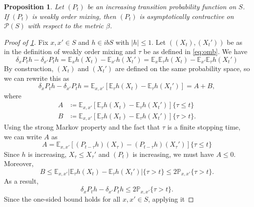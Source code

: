 \documentclass[10pt,a4paper]{amsart}
\newtheorem{proposition}{Proposition}
\newcommand{\EE}{\mathbb E}
\newcommand{\PP}{\mathbb P}
\newcommand{\pP}{\mathscr{P}}
\begin{document}
\begin{proposition}\label{p:orwomnew}
    Let $(P_t)$ be an increasing transition probability function on $S$.
    If $(P_t)$ is weakly order mixing, then $(P_t)$ is
    asymptotically contractive on $\pP(S)$ with respect to the metric $\beta$.
\end{proposition}

\begin{proof}[Proof of \cref{p:orwomnew}]
    Fix $x, x' \in S$ and $h \in ibS$ with $|h| \leq 1$.  Let $((X_t),
    (X_t'))$ be as in the definition of weakly order mixing and $\tau$ be as
    defined in \eqref{eq:omb}. We have
    \begin{equation*}
        \delta_x P_t h - \delta_{x'} P_t h
        = \EE_x  h(X_t) - \EE_{x'} h(X_t')
        = \EE_x \EE_\tau h(X_t) - \EE_{x'} \EE_\tau h(X_t')
    \end{equation*}
    By construction, $(X_t)$ and $(X_t')$ are defined on the same probability
    space, so we can rewrite this as
    \begin{equation*}
        \delta_x P_t h - \delta_{x'} P_t h
        = \EE_{x,x'} [\EE_\tau h(X_t) - \EE_\tau h(X_t')]
        = A + B,
    \end{equation*}
    where
    \begin{align*}
        A & \coloneq \EE_{x,x'} [\EE_\tau h(X_t) - \EE_\tau h(X_t')] \{\tau \leq t\}
        \\
        B & \coloneq \EE_{x,x'} [\EE_\tau h(X_t) - \EE_\tau h(X_t')] \{\tau > t\}.
    \end{align*}
    Using the strong Markov property and the fact that $\tau$ is a finite
    stopping time, we can write $A$ as
    \begin{equation*}
        A = \EE_{x,x'} [(P_{t-\tau}h)(X_\tau) - (P_{t-\tau} h)(X_\tau')] \{\tau \leq t\}
    \end{equation*}
    Since $h$ is increasing, $X_\tau \leq X_\tau'$ and $(P_t)$ is increasing, we
    must have $A \leq 0$.  Moreover,
    \begin{equation*}
        B \leq \EE_{x,x'} |\EE_\tau h(X_t) - \EE_\tau h(X_t')| \{\tau > t\}
        \leq 2 \PP_{x,x'} \{\tau > t\}.
    \end{equation*}
    As a result,
    \begin{equation*}
        \delta_x P_t h - \delta_{x'} P_t h \leq 2 \PP_{x,x'} \{\tau > t\}.
    \end{equation*}
    Since the one-sided bound holds for all $x, x' \in S$, applying it

\end{proof}
\end{document}
